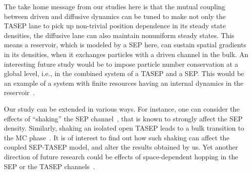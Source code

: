 \documentclass[aps,pre,twocolumn,superscriptaddress,amsmath,amssymb,longbibliography,floatfix,nofootinbib]{revtex4}
\begin{document}
{%

The take home message from our studies here is that the mutual coupling between driven and diffusive dynamics can be tuned to make not only the TASEP lane to pick up non-trivial position dependence in its steady state densities, the diffusive lane can also maintain nonuniform steady states. This means a reservoir, which is modeled by a SEP here, can sustain spatial gradients in its densities, when it exchanges particles with a driven channel in the bulk. An interesting future study would be to impose  particle number conservation at a global level, i.e., in the combined system of a TASEP and a SEP. This would be an example of a system with finite resources having an internal dynamics in the reservoir~\cite{parna,astik-parna}. 

{ Our study can be extended in various ways. For instance, one can consider the effects of ``shaking'' the SEP channel~\cite{tirtha-maes},  that is known to strongly affect the SEP density. Similarly, shaking an isolated open TASEP leads to a bulk transition to the MC phase~\cite{tirtha-maes}. It is of interest to find out how such shaking can affect the coupled SEP-TASEP model, and alter the results obtained by us.} Yet another direction of future research could be effects of space-dependent hopping in the SEP or the TASEP channels~\cite{sudip-jstat}. 

}
\end{document}
